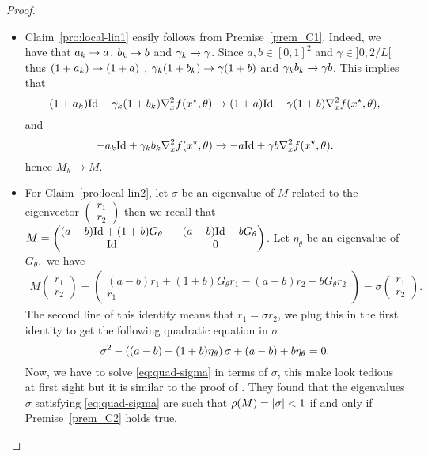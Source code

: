 \begin{appendices}
\begin{proof}
\begin{itemize}
\item Claim~\ref{pro:local-lin1} easily follows  from Premise~\ref{prem_C1}. Indeed, we have that $a_{k}\to a$, $b_{k}\to b$ and $\gamma_{k} \to \gamma$. Since $a,b\in[0,1]^2$ and $\gamma\in]0,2/L[$ thus  $(1+a_{k})\to(1+a)$ , $\gamma_{k}(1+b_{k})\to\gamma(1+b)$ and $\gamma_{k}b_{k}\to\gamma b$. This implies that
\[
 (1+a_{k})\mathrm{Id}-\gamma_{k}(1+b_{k})\nabla_x^2f(x^{\star},\theta)\to  (1+a)\mathrm{Id}-\gamma(1+b)\nabla_x^2f(x^{\star},\theta),
\]
and 
\[
-a_{k}\mathrm{Id}+\gamma_{k}b_{k}\nabla_x^2f(x^{\star},\theta)\to -a\mathrm{Id}+\gamma b\nabla_x^2f(x^{\star},\theta).
\]
hence $M_k\to M.$



\item For Claim~\ref{pro:local-lin2}, let $\sigma$ be an eigenvalue of $M$ related to the eigenvector $\begin{pmatrix}r_1\\r_2\end{pmatrix}$ then we recall that $M=\begin{pmatrix} (a-b)\mathrm{Id}+(1+b)G_{\theta} &-(a-b)\mathrm{Id}-bG_{\theta} \\ \mathrm{Id}  & 
		0\end{pmatrix}$.  Let $\eta_{\theta}$ be an eigenvalue of $G_{\theta},$  we have 			
\begin{align*}
M\begin{pmatrix}r_1\\r_2\end{pmatrix}=\begin{pmatrix} (a-b)r_1+(1+b)G_{\theta}r_1 -(a-b)r_2-bG_{\theta}r_2 \\ 
		r_1\end{pmatrix}=\sigma\begin{pmatrix}r_1\\r_2\end{pmatrix}.
\end{align*} 
The second line of this identity means that $r_1=\sigma r_2$, we plug this in the first identity to get the following quadratic equation in $\sigma$
\begin{equation}\label{eq:quad-sigma}
\sigma^2-\left({(a-b)+(1+b)\eta_{\theta}}\right)\sigma+(a-b)+b\eta_{\theta}=0.
\end{equation}		
Now, we have to solve \eqref{eq:quad-sigma} in terms of $\sigma$, this make look tedious at first sight but it is similar to the proof of \cite[Proposition~17]{liang_activity_2017}. They  found that the eigenvalues  $\sigma$ satisfying  \eqref{eq:quad-sigma} are such that $\rho(M)=\left| \sigma \right|<1$ if and only if Premise~\ref{prem_C2} holds true.
	

\end{itemize}
\end{proof}
\end{appendices}
